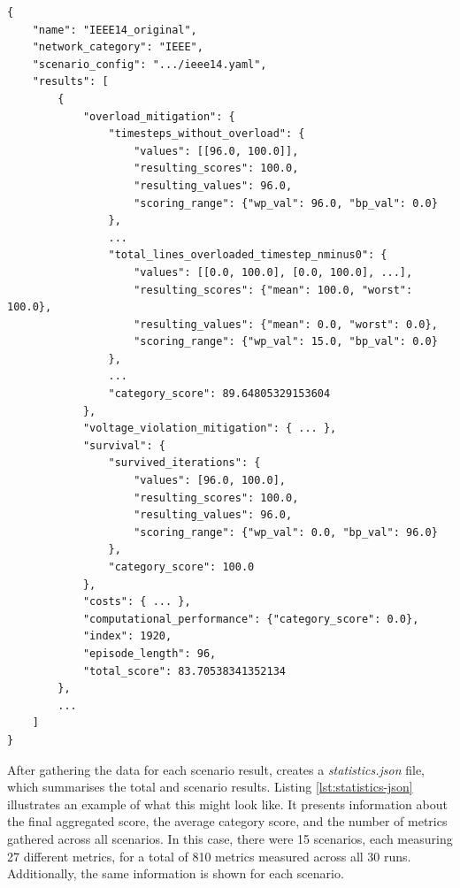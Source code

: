\begin{listing}[htp]
\begin{verbatim}
{
    "name": "IEEE14_original",
    "network_category": "IEEE",
    "scenario_config": ".../ieee14.yaml",
    "results": [
        {
            "overload_mitigation": {
                "timesteps_without_overload": {
                    "values": [[96.0, 100.0]],
                    "resulting_scores": 100.0,
                    "resulting_values": 96.0,
                    "scoring_range": {"wp_val": 96.0, "bp_val": 0.0}
                },
                ...
                "total_lines_overloaded_timestep_nminus0": {
                    "values": [[0.0, 100.0], [0.0, 100.0], ...],
                    "resulting_scores": {"mean": 100.0, "worst": 100.0},
                    "resulting_values": {"mean": 0.0, "worst": 0.0},
                    "scoring_range": {"wp_val": 15.0, "bp_val": 0.0}
                },
                ...
                "category_score": 89.64805329153604
            },
            "voltage_violation_mitigation": { ... },
            "survival": {
                "survived_iterations": {
                    "values": [96.0, 100.0],
                    "resulting_scores": 100.0,
                    "resulting_values": 96.0,
                    "scoring_range": {"wp_val": 0.0, "bp_val": 96.0}
                },
                "category_score": 100.0
            },
            "costs": { ... },
            "computational_performance": {"category_score": 0.0},
            "index": 1920,
            "episode_length": 96,
            "total_score": 83.70538341352134
        },
        ...
    ]
}
\end{verbatim}
\caption{Exemplary output for the do-nothing baseline agent.}
\label{lst:result-json}
\end{listing}

After gathering the data for each scenario result, \benchmark creates a \textit{statistics.json} file, which summarises the total and scenario results. Listing \ref{lst:statistics-json} illustrates an example of what this might look like. It presents information about the final aggregated score, the average category score, and the number of metrics gathered across all scenarios. In this case, there were 15 scenarios, each measuring 27 different metrics, for a total of 810 metrics measured across all 30 runs. Additionally, the same information is shown for each scenario. 

